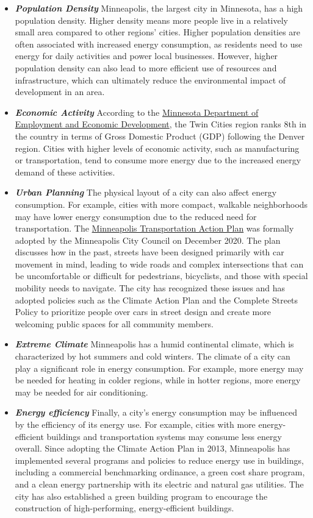 \documentclass[
]{book}
\begin{document}
\begin{itemize}
\item
  \textbf{\emph{Population Density}} Minneapolis, the largest city in Minnesota, has a high population density. Higher density means more people live in a relatively small area compared to other regions' cities. Higher population densities are often associated with increased energy consumption, as residents need to use energy for daily activities and power local businesses. However, higher population density can also lead to more efficient use of resources and infrastructure, which can ultimately reduce the environmental impact of development in an area.
\item
  \textbf{\emph{Economic Activity}} According to the \href{https://mn.gov/deed/data/economic-analysis/compare/compare-metro/economy/gdp.jsp}{Minnesota Department of Employment and Economic Development}, the Twin Cities region ranks 8th in the country in terms of Gross Domestic Product (GDP) following the Denver region. Cities with higher levels of economic activity, such as manufacturing or transportation, tend to consume more energy due to the increased energy demand of these activities.
\item
  \textbf{\emph{Urban Planning}} The physical layout of a city can also affect energy consumption. For example, cities with more compact, walkable neighborhoods may have lower energy consumption due to the reduced need for transportation. The \href{https://go.minneapolismn.gov/}{Minneapolis Transportation Action Plan} was formally adopted by the Minneapolis City Council on December 2020. The plan discusses how in the past, streets have been designed primarily with car movement in mind, leading to wide roads and complex intersections that can be uncomfortable or difficult for pedestrians, bicyclists, and those with special mobility needs to navigate. The city has recognized these issues and has adopted policies such as the Climate Action Plan and the Complete Streets Policy to prioritize people over cars in street design and create more welcoming public spaces for all community members.
\item
  \textbf{\emph{Extreme Climate}} Minneapolis has a humid continental climate, which is characterized by hot summers and cold winters. The climate of a city can play a significant role in energy consumption. For example, more energy may be needed for heating in colder regions, while in hotter regions, more energy may be needed for air conditioning.
\item
  \textbf{\emph{Energy efficiency}} Finally, a city's energy consumption may be influenced by the efficiency of its energy use. For example, cities with more energy-efficient buildings and transportation systems may consume less energy overall. Since adopting the Climate Action Plan in 2013, Minneapolis has implemented several programs and policies to reduce energy use in buildings, including a commercial benchmarking ordinance, a green cost share program, and a clean energy partnership with its electric and natural gas utilities. The city has also established a green building program to encourage the construction of high-performing, energy-efficient buildings.
\end{itemize}
\end{document}
